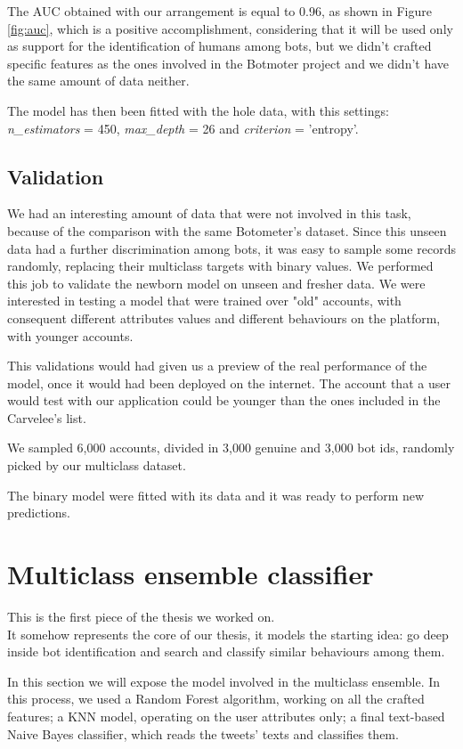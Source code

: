 The AUC obtained with our arrangement is equal to 0.96, as shown in Figure \ref{fig:auc}, which is a positive accomplishment, considering that it will be used only as support for the identification of humans among bots, but we didn't crafted specific features as the ones involved in the Botmoter project and we didn't have the same amount of data neither.

The model has then been fitted with the hole data, with this settings: \textit{ n\_estimators} = 450, \textit{max\_depth} = 26 and \textit{criterion} = 'entropy'.

\subsection{Validation}

We had an interesting amount of data that were not involved in this task, because of the comparison with the same Botometer's dataset. Since this unseen data had a further discrimination among bots, it was easy to sample some records randomly, replacing their multiclass targets with binary values.
We performed this job to validate the newborn model on unseen and fresher data.
We were interested in testing a model that were trained over "old" accounts, with consequent different attributes values and different behaviours on the platform, with younger accounts.

This validations would had given us a preview of the real performance of the model, once it would had been deployed on the internet. The account that a user would test with our application could be younger than the ones included in the Carvelee's list.

We sampled 6,000 accounts, divided in 3,000 genuine and 3,000 bot ids, randomly picked by our multiclass dataset.

The binary model were fitted with its data and it was ready to perform new predictions.

\section{Multiclass ensemble classifier}
This is the first piece of the thesis we worked on.\\
It somehow represents the core of our thesis, it models the starting idea: go deep inside bot identification and search and classify similar behaviours among them.

In this section we will expose the model involved in the multiclass ensemble. In this process, we used a Random Forest algorithm, working on all the crafted features; a KNN model, operating on the user attributes only; a final text-based Naive Bayes classifier, which reads the tweets' texts and classifies them.

